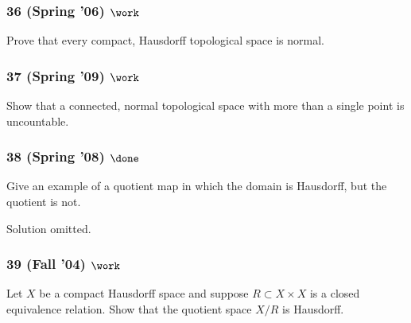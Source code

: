 \hypertarget{spring-06-work-1}{%
\subsubsection{\texorpdfstring{36 (Spring '06)
\(\work\)}{36 (Spring '06) \textbackslash work}}\label{spring-06-work-1}}

\begin{problem}[?]

Prove that every compact, Hausdorff topological space is normal.

\end{problem}

\hypertarget{spring-09-work-1}{%
\subsubsection{\texorpdfstring{37 (Spring '09)
\(\work\)}{37 (Spring '09) \textbackslash work}}\label{spring-09-work-1}}

\begin{problem}[?]

Show that a connected, normal topological space with more than a single
point is uncountable.

\end{problem}

\hypertarget{spring-08-done}{%
\subsubsection{\texorpdfstring{38 (Spring '08)
\(\done\)}{38 (Spring '08) \textbackslash done}}\label{spring-08-done}}

\begin{problem}[?]

Give an example of a quotient map in which the domain is Hausdorff, but
the quotient is not.

\end{problem}

Solution omitted.

\hypertarget{fall-04-work-1}{%
\subsubsection{\texorpdfstring{39 (Fall '04)
\(\work\)}{39 (Fall '04) \textbackslash work}}\label{fall-04-work-1}}

\begin{problem}[?]

Let \(X\) be a compact Hausdorff space and suppose
\(R \subset X \times X\) is a closed equivalence relation. Show that the
quotient space \(X/R\) is Hausdorff.

\end{problem}

